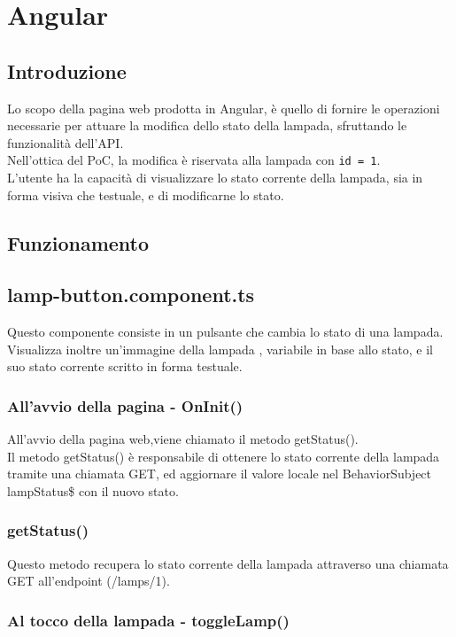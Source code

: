 \chapter{Angular}\label{angular}

\section{Introduzione}

Lo scopo della pagina web prodotta in Angular, è quello di fornire le operazioni necessarie per attuare la modifica dello stato della lampada, sfruttando le funzionalità dell'API. \\
Nell'ottica del PoC, la modifica è riservata alla lampada con \texttt{id = 1}. \\
L'utente ha la capacità di visualizzare lo stato corrente della lampada, sia in forma visiva che testuale, e di modificarne lo stato. 

\section{Funzionamento}

\section{lamp-button.component.ts}
Questo componente consiste in un pulsante che cambia lo stato di una lampada. Visualizza inoltre un'immagine della lampada , variabile in base allo stato, e il suo stato corrente scritto in forma testuale.

\subsection{All'avvio della pagina - OnInit()}
All'avvio della pagina web,viene chiamato il metodo getStatus().\\
Il metodo getStatus() è responsabile di ottenere lo stato corrente della lampada tramite una chiamata GET, ed aggiornare il valore locale nel BehaviorSubject lampStatus\$ con il nuovo stato.

\subsection{getStatus()}
Questo metodo recupera lo stato corrente della lampada attraverso una chiamata GET all'endpoint (/lamps/1). \\

\subsection{Al tocco della lampada - toggleLamp()}

